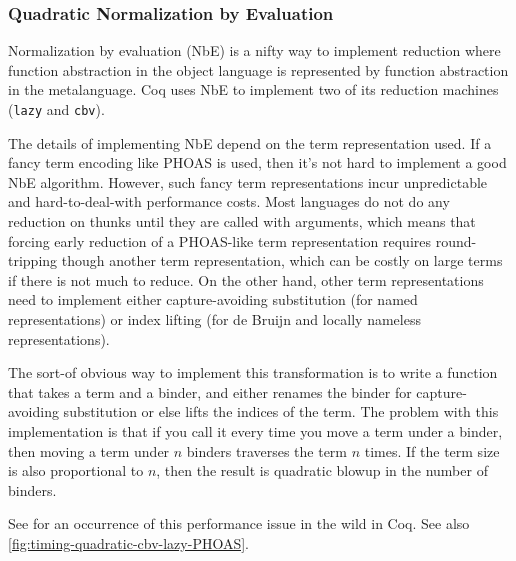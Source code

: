 \subsubsection{Quadratic Normalization by Evaluation} \label{sec:perf:quadratic-NbE} \label{sec:perf:quadratic-cbv}
Normalization by evaluation (NbE) is a nifty way to implement reduction where function abstraction in the object language is represented by function abstraction in the metalanguage.
Coq uses NbE to implement two of its reduction machines (\texttt{lazy} and \texttt{cbv}).

The details of implementing NbE depend on the term representation used.
If a fancy term encoding like PHOAS  is used, then it's not hard to implement a good NbE algorithm.
However, such fancy term representations incur unpredictable and hard-to-deal-with performance costs.
Most languages do not do any reduction on thunks until they are called with arguments, which means that forcing early reduction of a PHOAS-like term representation requires round-tripping though another term representation, which can be costly on large terms if there is not much to reduce.
On the other hand, other term representations need to implement either capture-avoiding substitution (for named representations) or index lifting (for de Bruijn and locally nameless representations).

The sort-of obvious way to implement this transformation is to write a function that takes a term and a binder, and either renames the binder for capture-avoiding substitution or else lifts the indices of the term.
The problem with this implementation is that if you call it every time you move a term under a binder, then moving a term under $n$ binders traverses the term $n$ times.
If the term size is also proportional to $n$, then the result is quadratic blowup in the number of binders.

See  for an occurrence of this performance issue in the wild in Coq.
See also \autoref{fig:timing-quadratic-cbv-lazy-PHOAS}.


